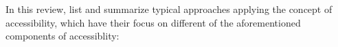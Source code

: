
In this review, \citet{Geurs2004AccessibilityReview} list and summarize typical approaches applying the concept 
of accessibility, which have their focus on different of the aforementioned components of accessiblity:

